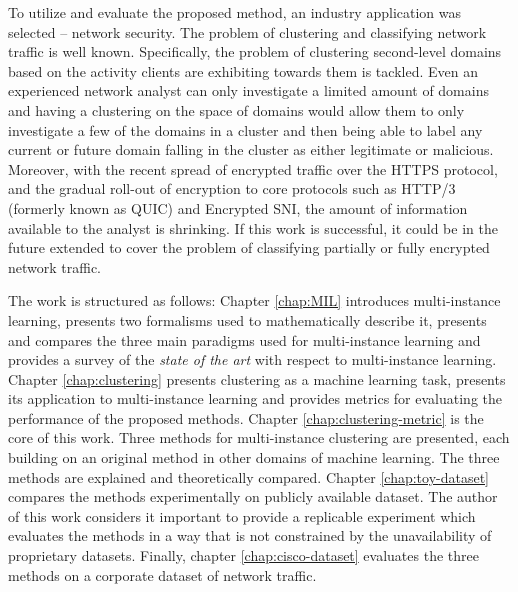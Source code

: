 To utilize and evaluate the proposed method, an industry application was selected -- network security. The problem of clustering and classifying network traffic is well known. Specifically, the problem of clustering second-level domains based on the activity clients are exhibiting towards them is tackled. Even an experienced network analyst can only investigate a limited amount of domains and having a clustering on the space of domains would allow them to only investigate a few of the domains in a cluster and then being able to label any current or future domain falling in the cluster as either legitimate or malicious. Moreover, with the recent spread of encrypted traffic over the HTTPS protocol, and the gradual roll-out of encryption to core protocols such as HTTP/3 (formerly known as QUIC) and Encrypted SNI, the amount of information available to the analyst is shrinking. If this work is successful, it could be in the future extended to cover the problem of classifying partially or fully encrypted network traffic.

The work is structured as follows: Chapter \ref{chap:MIL} introduces multi-instance learning, presents two formalisms used to mathematically describe it, presents and compares the three main paradigms used for multi-instance learning and provides a survey of the \textit{state of the art} with respect to multi-instance learning. Chapter \ref{chap:clustering} presents clustering as a machine learning task, presents its application to multi-instance learning and provides metrics for evaluating the performance of the proposed methods. Chapter \ref{chap:clustering-metric} is the core of this work. Three methods for multi-instance clustering are presented, each building on an original method in other domains of machine learning. The three methods are explained and theoretically compared. Chapter \ref{chap:toy-dataset} compares the methods experimentally on publicly available dataset. The author of this work considers it important to provide a replicable experiment which evaluates the methods in a way that is not constrained by the unavailability of proprietary datasets. Finally, chapter \ref{chap:cisco-dataset} evaluates the three methods on a corporate dataset of network traffic.
